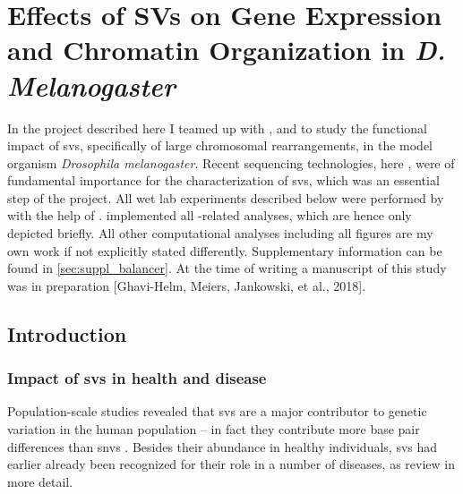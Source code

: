 \chapter{Effects of SVs on Gene Expression and Chromatin
Organization in \texorpdfstring{\textit{D. Melanogaster}}{D. Melanogaster}}
\label{sec:balancer}



In the project described here I teamed up with \yad, \alek and \eileen to study the functional
impact of \acp{sv}, specifically of large chromosomal rearrangements, in the model
organism \textit{Drosophila melanogaster}. Recent
sequencing technologies, here \hic, were of fundamental importance for the characterization
of \acp{sv}, which was an essential step of the project. All wet lab experiments
described below were performed by \yad with the help of \rebecca.
\alek implemented all \hic-related analyses, which are hence
only depicted briefly. All other computational analyses including all figures
are my own work if not explicitly stated differently. Supplementary information
can be found in \cref{sec:suppl_balancer}. At the time of writing a manuscript
of this study was in preparation [Ghavi-Helm, Meiers, Jankowski, et al., 2018].



\section{Introduction}
\label{sec:balancer_background}


\subsection{Impact of \texorpdfstring{\acsp{sv}}{SVs} in health and disease}

Population-scale studies revealed that \acp{sv} are a major contributor to
genetic variation in the human population \citep{Conrad2010} – in fact they
contribute more base pair differences than \acp{snv} \citep{Sudmant2015}.
Besides their abundance in healthy individuals, \acp{sv} had earlier already
been recognized for their role in a number of diseases, as
\citet{Zhang2009,Weischenfeldt2013,Carvalho2016} review in more detail.

